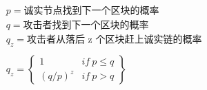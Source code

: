 \documentclass{article}
\begin{document}
\pagestyle{empty}

\begin{align*}
  & p = \text{诚实节点找到下一个区块的概率}            \\
  & q = \text{攻击者找到下一个区块的概率}              \\
  & q_z = \text{攻击者从落后 z 个区块赶上诚实链的概率} \\
 \\
  & q_z = \begin{Bmatrix}
  1         & if \ p \leq q \\
  (q / p)^z & if \ p > q    
 \end{Bmatrix}                    
\end{align*}
\end{document}
